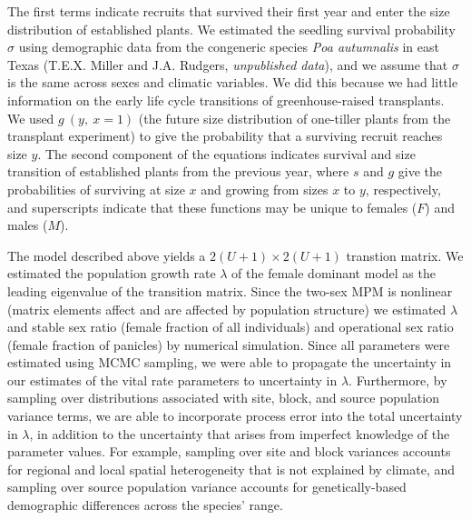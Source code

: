 \documentclass[12pt]{article}\usepackage[]{graphicx}\usepackage[dvipsnames]{xcolor}
\begin{document}
\noindent The first terms indicate recruits that survived their first year and enter the size distribution of established plants.
We estimated the seedling survival probability $\sigma$ using demographic data from the congeneric species \textit{Poa autumnalis} in east Texas (T.E.X. Miller and J.A. Rudgers, \textit{unpublished data}), and we assume that $\sigma$ is the same across sexes and climatic variables. 
We did this because we had little information on the early life cycle transitions of greenhouse-raised transplants.
We used $g\ (y,\ x=1)$ (the future size distribution of one-tiller plants from the transplant experiment) to give the probability that a surviving recruit reaches size $y$.
The second component of the equations indicates survival and size transition of established plants from the previous year, where $s$ and $g$ give the probabilities of surviving at size $x$ and growing from sizes $x$ to $y$, respectively, and superscripts indicate that these functions may be unique to females ($F$) and males ($M$).

The model described above yields a $2(U+1) \times 2(U+1)$ transtion matrix. 
We estimated the population growth rate $\lambda$ of the female dominant model as the leading eigenvalue of the transition matrix. 
Since the two-sex MPM is nonlinear (matrix elements affect and are affected by population structure) we estimated $\lambda$ and stable sex ratio (female fraction of all individuals) and operational sex ratio (female fraction of panicles) by numerical simulation.
Since all parameters were estimated using MCMC sampling, we were able to propagate the uncertainty in our estimates of the vital rate parameters to uncertainty in $\lambda$. 
Furthermore, by sampling over distributions associated with site, block, and source population variance terms, we are able to incorporate process error into the total uncertainty in $\lambda$, in addition to the uncertainty that arises from imperfect knowledge of the parameter values. 
For example, sampling over site and block variances accounts for regional and local spatial heterogeneity that is not explained by climate, and sampling over source population variance accounts for genetically-based demographic differences across the species' range.
\end{document}
